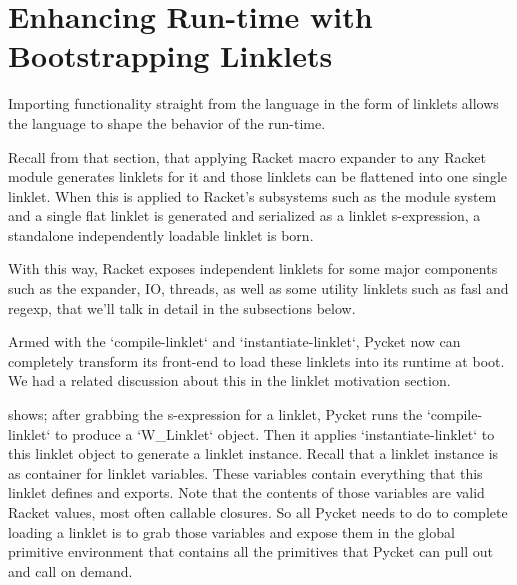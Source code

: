 	\section[\texorpdfstring{Enhancing Run-time with Bootstrapping Linklets}{Bootstrapping Linklets}]{Enhancing Run-time with Bootstrapping Linklets}
		\begin{mainpoint}
			Importing functionality straight from the language in the form of linklets allows the language to shape the behavior of the run-time.
		\end{mainpoint}

		\begin{paragraph-here}%
			Recall from that section, that applying Racket macro expander to any Racket module generates linklets for it and those linklets can be flattened into one single linklet. When this is applied to Racket's subsystems such as the module system and a single flat linklet is generated and serialized as a linklet s-expression, a standalone independently loadable linklet is born.
		\end{paragraph-here}

		\begin{paragraph-here}%
			With this way, Racket exposes independent linklets for some major components such as the expander, IO, threads, as well as some utility linklets such as fasl and regexp, that we'll talk in detail in the subsections below.
		\end{paragraph-here}

		\begin{paragraph-here}%
			Armed with the `compile-linklet` and `instantiate-linklet`, Pycket now can completely transform its front-end to load these linklets into its runtime at boot. We had a related discussion about this in the linklet motivation section.
		\end{paragraph-here}


		\begin{paragraph-here}%
			 shows; after grabbing the s-expression for a linklet, Pycket runs the `compile-linklet` to produce a `W\_Linklet` object. Then it applies `instantiate-linklet` to this linklet object to generate a linklet instance. Recall that a linklet instance is as container for linklet variables. These variables contain everything that this linklet defines and exports. Note that the contents of those variables are valid Racket values, most often callable closures. So all Pycket needs to do to complete loading a linklet is to grab those variables and expose them in the global primitive environment that contains all the primitives that Pycket can pull out and call on demand.
		\end{paragraph-here}

